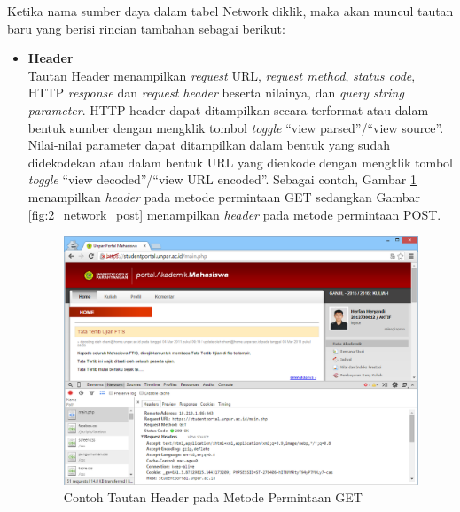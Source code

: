 Ketika nama sumber daya dalam tabel Network diklik, maka akan muncul tautan baru yang berisi rincian tambahan sebagai berikut:
\begin{itemize}
	\item \textbf{Header}\\
	Tautan Header menampilkan \textit{request} URL, \textit{request method}, \textit{status code}, HTTP \textit{response} dan \textit{request header} beserta nilainya, dan \textit{query string parameter}. HTTP header dapat ditampilkan secara terformat atau dalam bentuk sumber dengan mengklik tombol \textit{toggle} ``view parsed''/``view source''. Nilai-nilai parameter dapat ditampilkan dalam bentuk yang sudah didekodekan atau dalam bentuk URL yang dienkode dengan mengklik tombol \textit{toggle} ``view decoded''/``view URL encoded''. Sebagai contoh, Gambar \ref{fig:2_network_get} menampilkan \textit{header} pada metode permintaan GET sedangkan Gambar \ref{fig:2_network_post} menampilkan \textit{header} pada metode permintaan POST.
	
\begin{figure}[H]
	\centering
	\includegraphics[scale=0.5]{Gambar/network-header}
	\caption{Contoh Tautan Header pada Metode Permintaan GET} 
	\label{fig:2_network_get}
\end{figure}


\end{itemize}
